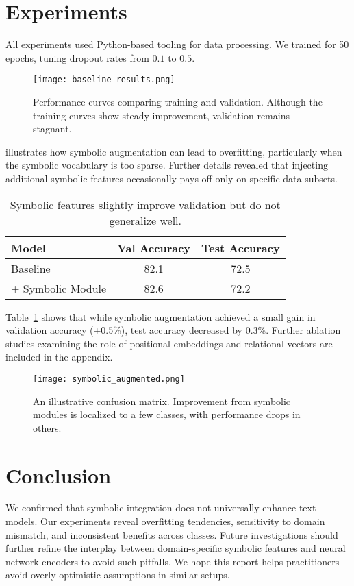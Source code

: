 \documentclass[12pt]{article}
\begin{document}
\section{Experiments}
All experiments used Python-based tooling for data processing. We trained for 50 epochs, tuning dropout rates from $0.1$ to $0.5$.

\begin{figure}[t]
  \centering
  \texttt{[image: baseline\_results.png]}
  \caption{Performance curves comparing training and validation. Although the training curves show steady improvement, validation remains stagnant.}
  \label{fig:baseline}
\end{figure}

 illustrates how symbolic augmentation can lead to overfitting, particularly when the symbolic vocabulary is too sparse. Further details revealed that injecting additional symbolic features occasionally pays off only on specific data subsets.

\begin{table}[t]
\centering
\begin{tabular}{@{}lcc@{}}
\toprule
Model             & Val Accuracy & Test Accuracy \\
\midrule
Baseline          & 82.1        & 72.5          \\
+ Symbolic Module & 82.6        & 72.2          \\
\bottomrule
\end{tabular}
\caption{Symbolic features slightly improve validation but do not generalize well.}
\label{tab:results}
\end{table}

Table~\ref{tab:results} shows that while symbolic augmentation achieved a small gain in validation accuracy (+0.5\%), test accuracy decreased by 0.3\%. Further ablation studies examining the role of positional embeddings and relational vectors are included in the appendix.

\begin{figure}[t]
  \centering
  \texttt{[image: symbolic\_augmented.png]}
  \caption{An illustrative confusion matrix. Improvement from symbolic modules is localized to a few classes, with performance drops in others.}
  \label{fig:symbolic}
\end{figure}

\section{Conclusion}
We confirmed that symbolic integration does not universally enhance text models. Our experiments reveal overfitting tendencies, sensitivity to domain mismatch, and inconsistent benefits across classes. Future investigations should further refine the interplay between domain-specific symbolic features and neural network encoders to avoid such pitfalls. We hope this report helps practitioners avoid overly optimistic assumptions in similar setups.
\end{document}
